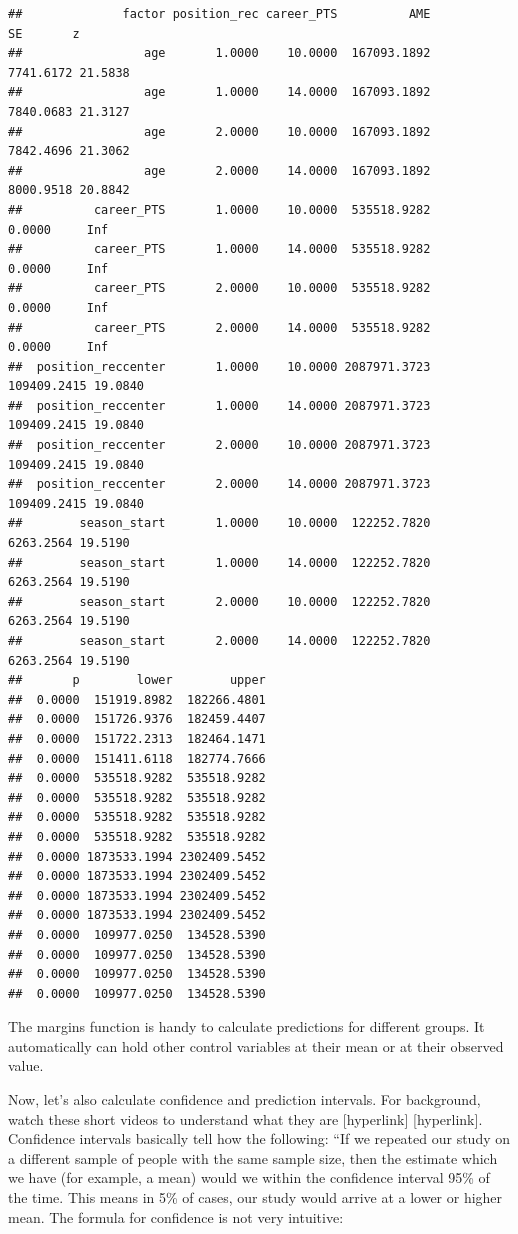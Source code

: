 \documentclass[
]{book}
\begin{document}
\begin{verbatim}
##              factor position_rec career_PTS          AME          SE       z
##                 age       1.0000    10.0000  167093.1892   7741.6172 21.5838
##                 age       1.0000    14.0000  167093.1892   7840.0683 21.3127
##                 age       2.0000    10.0000  167093.1892   7842.4696 21.3062
##                 age       2.0000    14.0000  167093.1892   8000.9518 20.8842
##          career_PTS       1.0000    10.0000  535518.9282      0.0000     Inf
##          career_PTS       1.0000    14.0000  535518.9282      0.0000     Inf
##          career_PTS       2.0000    10.0000  535518.9282      0.0000     Inf
##          career_PTS       2.0000    14.0000  535518.9282      0.0000     Inf
##  position_reccenter       1.0000    10.0000 2087971.3723 109409.2415 19.0840
##  position_reccenter       1.0000    14.0000 2087971.3723 109409.2415 19.0840
##  position_reccenter       2.0000    10.0000 2087971.3723 109409.2415 19.0840
##  position_reccenter       2.0000    14.0000 2087971.3723 109409.2415 19.0840
##        season_start       1.0000    10.0000  122252.7820   6263.2564 19.5190
##        season_start       1.0000    14.0000  122252.7820   6263.2564 19.5190
##        season_start       2.0000    10.0000  122252.7820   6263.2564 19.5190
##        season_start       2.0000    14.0000  122252.7820   6263.2564 19.5190
##       p        lower        upper
##  0.0000  151919.8982  182266.4801
##  0.0000  151726.9376  182459.4407
##  0.0000  151722.2313  182464.1471
##  0.0000  151411.6118  182774.7666
##  0.0000  535518.9282  535518.9282
##  0.0000  535518.9282  535518.9282
##  0.0000  535518.9282  535518.9282
##  0.0000  535518.9282  535518.9282
##  0.0000 1873533.1994 2302409.5452
##  0.0000 1873533.1994 2302409.5452
##  0.0000 1873533.1994 2302409.5452
##  0.0000 1873533.1994 2302409.5452
##  0.0000  109977.0250  134528.5390
##  0.0000  109977.0250  134528.5390
##  0.0000  109977.0250  134528.5390
##  0.0000  109977.0250  134528.5390
\end{verbatim}

The margins function is handy to calculate predictions for different groups.
It automatically can hold other control variables at their mean or at their observed value.

Now, let's also calculate confidence and prediction intervals. For background, watch these short videos to understand what they are {[}hyperlink{]} {[}hyperlink{]}. Confidence intervals basically tell how the following: ``If we repeated our study on a different sample of people with the same sample size, then the estimate which we have (for example, a mean) would we within the confidence interval 95\% of the time. This means in 5\% of cases, our study would arrive at a lower or higher mean. The formula for confidence is not very intuitive:
\end{document}
